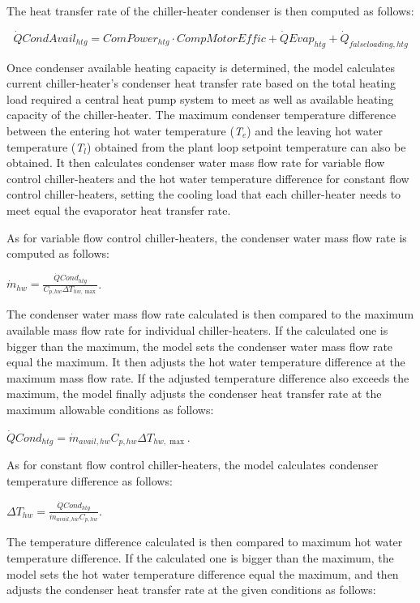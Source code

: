 The heat transfer rate of the chiller-heater condenser is then computed as follows:

\begin{equation}
\dot QCondAvai{l_{htg}} = ComPowe{r_{htg}} \cdot CompMotorEffic + \dot QEva{p_{htg}} + {\dot Q_{falseloading,htg}}
\end{equation}

Once condenser available heating capacity is determined, the model calculates current chiller-heater's condenser heat transfer rate based on the total heating load required a central heat pump system to meet as well as available heating capacity of the chiller-heater. The maximum condenser temperature difference between the entering hot water temperature (\emph{T\(_{e}\)}) and the leaving hot water temperature (\emph{T\(_{l}\)}) obtained from the plant loop setpoint temperature can also be obtained. It then calculates condenser water mass flow rate for variable flow control chiller-heaters and the hot water temperature difference for constant flow control chiller-heaters, setting the cooling load that each chiller-heater needs to meet equal the evaporator heat transfer rate.

As for variable flow control chiller-heaters, the condenser water mass flow rate is computed as follows:

\textbf{\emph{\({\dot m_{hw}} = \frac{{\dot QCon{d_{htg}}}}{{{C_{p,hw}}\Delta {T_{hw,\max }}}}\)}}.

The condenser water mass flow rate calculated is then compared to the maximum available mass flow rate for individual chiller-heaters. If the calculated one is bigger than the maximum, the model sets the condenser water mass flow rate equal the maximum. It then adjusts the hot water temperature difference at the maximum mass flow rate. If the adjusted temperature difference also exceeds the maximum, the model finally adjusts the condenser heat transfer rate at the maximum allowable conditions as follows:

\textbf{\emph{\(\dot QCon{d_{htg}} = {\dot m_{avail,hw}}{C_{p,hw}}\Delta {T_{hw,\max }}\)}}.

As for constant flow control chiller-heaters, the model calculates condenser temperature difference as follows:

\textbf{\emph{\(\Delta {T_{hw}} = \frac{{\dot QCon{d_{htg}}}}{{{{\dot m}_{avail,hw}}{C_{p,hw}}}}\)}}.

The temperature difference calculated is then compared to maximum hot water temperature difference. If the calculated one is bigger than the maximum, the model sets the hot water temperature difference equal the maximum, and then adjusts the condenser heat transfer rate at the given conditions as follows:

